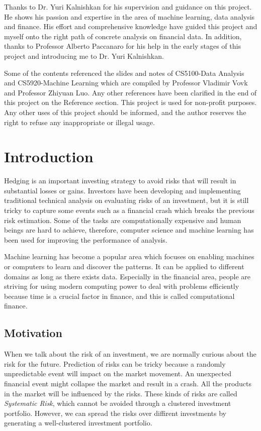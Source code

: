 \documentclass[11pt]{article} %
\theoremstyle{plain}
\theoremstyle{definition}
\begin{document}
Thanks to Dr. Yuri Kalnishkan for his supervision and guidance on this project. He shows his passion and expertise in the area of machine learning, data analysis and finance. His effort and comprehensive knowledge have guided this project and myself onto the right path of concrete analysis on financial data. In addition, thanks to Professor Alberto Paccanaro for his help in the early stages of this project and introducing me to Dr. Yuri Kalnishkan.

Some of the contents referenced the slides and notes of CS5100-Data Analysis and CS5920-Machine Learning which are compiled by Professor Vladimir Vovk and Professor Zhiyuan Luo. Any other references have been clarified in the end of this project on the Reference section. This project is used for non-profit purposes. Any other uses of this project should be informed, and the author reserves the right to refuse any inappropriate or illegal usage.

\clearpage


\section{Introduction}
\setcounter{page}{1}

Hedging is an important investing strategy to avoid risks that will result in substantial losses or gains. Investors have been developing and implementing traditional technical analysis on evaluating risks of an investment, but it is still tricky to capture some events such as a financial crash which breaks the previous risk estimation. Some of the tasks are computationally expensive and human beings are hard to achieve, therefore, computer science and machine learning has been used for improving the performance of analysis.

Machine learning has become a popular area which focuses on enabling machines or computers to learn and discover the patterns. It can be applied to different domains as long as there exists data. Especially in the financial area, people are striving for using modern computing power to deal with problems efficiently because time is a crucial factor in finance, and this is called computational finance.

\subsection{Motivation}

When we talk about the risk of an investment, we are normally curious about the risk for the future. Prediction of risks can be tricky because a randomly unpredictable event will impact on the market movement. An unexpected financial event might collapse the market and result in a crash. All the products in the market will be influenced by the risks. These kinds of risks are called \textsl{Systematic Risk}, which cannot be avoided through a clustered investment portfolio. However, we can spread the risks over diffirent investments by generating a well-clustered investment portfolio.
\end{document}
